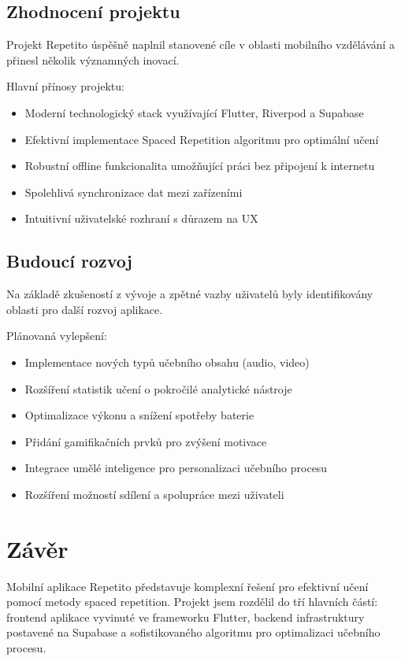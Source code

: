 \documentclass[12pt, a4paper, twoside, openright]{report}
\begin{document}
	\section{Zhodnocení projektu}
	Projekt Repetito úspěšně naplnil stanovené cíle v oblasti mobilního vzdělávání a přinesl několik významných inovací.

	Hlavní přínosy projektu:
	\begin{itemize}
		\item Moderní technologický stack využívající Flutter, Riverpod a Supabase
		\item Efektivní implementace Spaced Repetition algoritmu pro optimální učení
		\item Robustní offline funkcionalita umožňující práci bez připojení k internetu
		\item Spolehlivá synchronizace dat mezi zařízeními
		\item Intuitivní uživatelské rozhraní s důrazem na UX
	\end{itemize}

	\section{Budoucí rozvoj}
	Na základě zkušeností z vývoje a zpětné vazby uživatelů byly identifikovány oblasti pro další rozvoj aplikace.

	Plánovaná vylepšení:
	\begin{itemize}
		\item Implementace nových typů učebního obsahu (audio, video)
		\item Rozšíření statistik učení o pokročilé analytické nástroje
		\item Optimalizace výkonu a snížení spotřeby baterie
		\item Přidání gamifikačních prvků pro zvýšení motivace
		\item Integrace umělé inteligence pro personalizaci učebního procesu
		\item Rozšíření možností sdílení a spolupráce mezi uživateli
	\end{itemize}

\chapter{Závěr}
	Mobilní aplikace Repetito představuje komplexní řešení pro efektivní učení pomocí metody spaced repetition. Projekt jsem rozdělil do tří hlavních částí: frontend aplikace vyvinuté ve frameworku Flutter, backend infrastruktury postavené na Supabase a sofistikovaného algoritmu pro optimalizaci učebního procesu.
\end{document}
